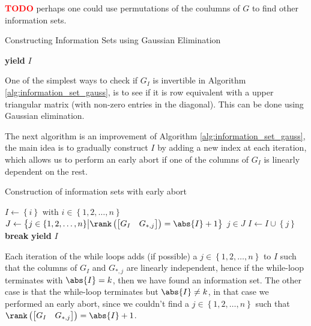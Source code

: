 \textcolor{red}{\textbf{TODO}} perhaps one could use permutations of the coulumns of $G$ to find other information sets.


\begin{algorithm}[H]
\caption{Constructing Information Sets using Gaussian Elimination}\label{alg:information_set_gauss}
\begin{algorithmic}
   
    \State \textbf{yield} $I$
    \EndIf
  \EndFor
  \EndProcedure
\end{algorithmic}
\end{algorithm}
\begin{remark}\label{rem:is_gauss}
  One of the simplest ways to check if $G_I$ is invertible in Algorithm \ref{alg:information_set_gauss}, is to see if it is row equivalent with a upper triangular matrix (with non-zero entries in the diagonal). This can be done using Gaussian elimination.
\end{remark}

The next algorithm is an improvement of Algorithm \ref{alg:information_set_gauss}, the main idea is to gradually construct $I$ by adding a new index at each iteration, which allows us to perform an early abort if one of the columns of $G_I$ is linearly dependent on the rest.

\begin{algorithm}[H]
\caption{Construction of information sets with early abort}\label{alg:information_set_early_abort}
\begin{algorithmic}
  \Loop
    \State $I \gets \left\{i\right\}$ with $i \in \left\{1, 2, \ldots, n\right\}$ 
       \State $J \gets \left\{j \in \left\{1, 2, \ldots, n\right\} \middle| \rank\left(\begin{bmatrix} G_I & G_{*, j} \end{bmatrix}\right) = \abs{I} + 1\right\}$
          \State $j \in J$ 
          \State $I \gets I \cup \left\{j\right\}$
       \Else
         \State \textbf{break}
       \EndIf
    \EndWhile
       \State \textbf{yield} $I$
    \EndIf
  \EndLoop
  \EndProcedure
\end{algorithmic}
\end{algorithm}
Each iteration of the while loops adds (if possible) a $j \in \left\{1, 2, \ldots, n\right\}$ to $I$ such that the columns of $G_I$ and $G_{*, j}$ are linearly independent, hence if the while-loop terminates with $\abs{I} = k$, then we have found an information set. The other case is that the while-loop terminates but $\abs{I} \neq k$, in that case we performed an early abort, since we couldn't find a $j \in \left\{1, 2, \ldots, n\right\}$ such that $\rank\left(\begin{bmatrix} G_I & G_{*, j} \end{bmatrix}\right) = \abs{I} + 1$.
